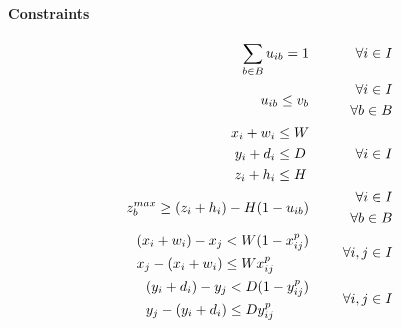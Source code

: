 \paragraph*{Constraints}
\begin{eqnarray}
    \sum_{b \in B} u_{ib} = 1 \hspace{.5cm}& & \forall i \in I  \label{cons:all_items_in_bin} \\
    u_{ib} \le v_b \hspace{.5cm}& & \begin{aligned} \forall i \in I \\ 
                                                    \forall b \in B 
                                    \end{aligned} \label{cons:items_in_used_bins} \\
    \begin{aligned} x_i + w_i &\le W \\ 
                    y_i + d_i &\le D \\
                    z_i + h_i &\le H \\ \end{aligned} \hspace{.5cm}& & \forall i \in I \label{cons:inside} \\
    z^{max}_b \ge (z_i + h_i) - H(1-u_{ib}) \hspace{.5cm}& & \begin{aligned} \forall i \in I \\ 
                                                                    \forall b \in B 
                                                            \end{aligned} \label{cons:maxz} \\
    \begin{aligned} (x_i + w_i) - x_j &< W(1 - x^p_{ij}) \\ %
                    x_j - (x_i + w_i) &\le W x^p_{ij} \end{aligned} \hspace{.5cm}& & \forall i,j \in I \label{cons:x_prec} \\
    \begin{aligned} (y_i + d_i) - y_j &< D(1 - y^p_{ij}) \\
                    y_j - (y_i + d_i) &\le D y^p_{ij} \end{aligned} \hspace{.5cm}& & \forall i,j \in I \label{cons:y_prec} \\

\end{eqnarray}
